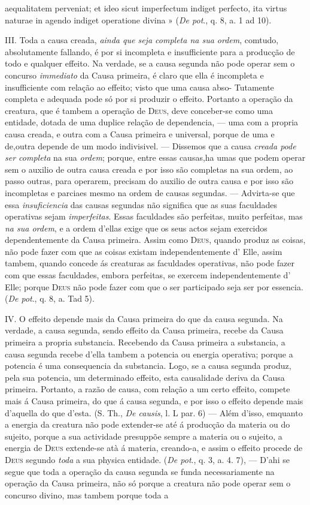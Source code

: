 aequalitatem perveniat; et ideo sicut imperfectum indiget perfecto, ita virtus naturae in agendo indiget operatione divina » (\emph{De pot}., q. 8, a. 1 ad 10).\par III. Toda a causa creada, \emph{ainda que seja completa na sua ordem}, comtudo, absolutamente fallando, é por si incompleta e insufficiente para a producção de todo e qualquer effeito. Na verdade, se a causa segunda não pode operar sem o concurso \emph{immediato} da Causa primeira, é claro que ella é incompleta e insufficiente com relação ao effeito; visto que uma causa abso- Tutamente completa e adequada pode só por si produzir o effeito. Portanto a operação da creatura, que é tambem a operação de \textsc{Deus}, deve conceber-se como uma entidade, dotada de uma duplice relação de dependencia, --- uma com a propria causa creada, e outra com a Causa primeira e universal, porque de uma e de,outra depende de um modo indivisivel. --- Dissemos que a causa \emph{creada pode ser completa} na sua \emph{ordem}; porque, entre essas causas,ha umas que podem operar sem o auxilio de outra causa creada e por isso são completas na sua ordem, ao passo outras, para operarem, precisam do auxilio de outra causa e por isso são incompletas e parciaes mesmo na ordem de causas segundas. --- Advirta-se que essa \emph{insuficiencia} das causas segundas não significa que as suas faculdades operativas sejam \emph{imperfeitas}. Essas faculdades são perfeitas, muito perfeitas, mas \emph{na sua ordem}, e a ordem d'ellas exige que os seus actos sejam exercidos dependentemente da Causa primeira. Assim como \textsc{Deus}, quando produz as coisas, não pode fazer com que as coisas existam independentemente d' Elle, assim tambem, quando concede ás creaturas as faculdades operativas, não pode fazer com que essas faculdades, embora perfeitas, se exercem independentemente d' Elle; porque \textsc{Deus} não pode fazer com que o ser participado seja ser por essencia. (\emph{De pot}., q. 8, a. Tad 5).\par IV. O effeito depende mais da Causa primeira do que da causa segunda. Na verdade, a causa segunda, sendo effeito da Causa primeira, recebe da Causa primeira a propria substancia. Recebendo da Causa primeira a substancia, a causa segunda recebe d'ella tambem a potencia ou energia operativa; porque a potencia é uma consequencia da substancia. Logo, se a causa segunda produz, pela sua potencia, um determinado effeito, esta causalidade deriva da Causa primeira. Portanto, a razão de causa, com relação a um certo effeito, compete mais á Causa primeira, do que á causa segunda, e por isso o effeito depende mais d'aquella do que d'esta. (S. Th., \emph{De causis}, l. L par. 6) --- Além d'isso, emquanto a energia da creatura não pode extender-se até á producção da materia ou do sujeito, porque a sua actividade presuppõe sempre a materia ou o sujeito, a energia de \textsc{Deus} extende-se atà á materia, creando-a, e assim o effeito procede de \textsc{Deus} segundo \emph{toda} a sua physica entidade. (\emph{De pot}., q. 3, a. 4. 7), --- D'ahi se segue que toda a operação da causa segunda se funda necessariamente na operação da Causa primeira, não só porque a creatura não pode operar sem o concurso divino, mas tambem porque toda a 